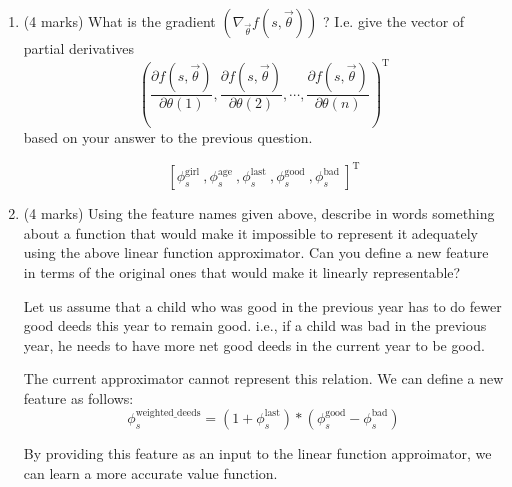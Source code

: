 \documentclass[addpoints,12pt,solution]{exam}
\begin{document}
\begin{questions}
\begin{enumerate}[label=(\alph*)]
\begin{solution}
            \end{solution}

            \item (4 marks) What is the gradient $\left(\nabla_{\vec{\theta}} f(s, \vec{\theta})\right)$ ? I.e. give the vector of partial derivatives
            \[
                \left(\frac{\partial f(s, \vec{\theta})}{\partial \theta(1)}, \frac{\partial f(s, \vec{\theta})}{\partial \theta(2)}, \cdots, \frac{\partial f(s, \vec{\theta})}{\partial \theta(n)}\right)^{\mathrm{T}}
            \]
            based on your answer to the previous question.
            \begin{solution}
                \[
                    [\phi_{s}^{\text {girl }}, \phi_{s}^{\text {age }}, \phi_{s}^{\text {last }}, \phi_{s}^{\text {good }}, \phi_{s}^{\text {bad }}]^{\mathrm{T}}
                \]
            \end{solution}
            \item (4 marks) Using the feature names given above, describe in words something about a function that would make it impossible to represent it adequately using the above linear function approximator. Can you define a new feature in terms of the original ones that would make it linearly representable?
            \begin{solution}
                Let us assume that a child who was good in the previous year has to do fewer good deeds this year to remain good.
                i.e., if a child was bad in the previous year, he needs to have more net good deeds in the current year to be good.

                The current approximator cannot represent this relation. We can define a new feature as follows:
                \[
                    \phi_{s}^{\text{weighted\_deeds}} = (1 + \phi_s^{\text{last}}) * (\phi_s^\text{good} - \phi_s^\text{bad})
                \]

                By providing this feature as an input to the linear function approimator, we can learn a more accurate value function.
            \end{solution}
        \end{enumerate}



\end{questions}
\end{document}
